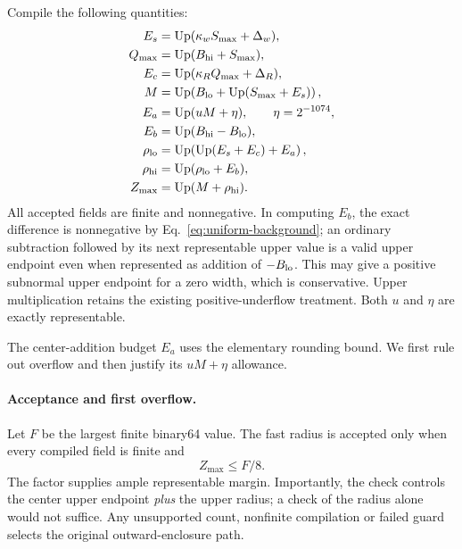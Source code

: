 \documentclass[11pt]{article}
\begin{document}
Compile the following quantities:
\begin{align}
E_s&=\operatorname{Up}(\kappa_wS_{\max}+\Delta_w),\nonumber\\
Q_{\max}&=\operatorname{Up}(B_{\rm hi}+S_{\max}),\nonumber\\
E_c&=\operatorname{Up}(\kappa_RQ_{\max}+\Delta_R),\nonumber\\
M&=\operatorname{Up}\!\left(B_{\rm lo}+\operatorname{Up}(S_{\max}+E_s)\right),\nonumber\\
E_a&=\operatorname{Up}(uM+\eta),\qquad\eta=2^{-1074},\nonumber\\
E_b&=\operatorname{Up}(B_{\rm hi}-B_{\rm lo}),\nonumber\\
\rho_{\rm lo}&=\operatorname{Up}\!\left(\operatorname{Up}(E_s+E_c)+E_a\right),\nonumber\\
\rho_{\rm hi}&=\operatorname{Up}(\rho_{\rm lo}+E_b),\nonumber\\
Z_{\max}&=\operatorname{Up}(M+\rho_{\rm hi}).
\label{eq:uniform-budgets}
\end{align}
All accepted fields are finite and nonnegative. In computing $E_b$, the exact difference is nonnegative by Eq.~\eqref{eq:uniform-background}; an ordinary subtraction followed by its next representable upper value is a valid upper endpoint even when represented as addition of $-B_{\rm lo}$. This may give a positive subnormal upper endpoint for a zero width, which is conservative. Upper multiplication retains the existing positive-underflow treatment. Both $u$ and $\eta$ are exactly representable.

The center-addition budget $E_a$ uses the elementary rounding bound. We first rule out overflow and then justify its $uM+\eta$ allowance.

\paragraph{Acceptance and first overflow.}
Let $F$ be the largest finite binary64 value. The fast radius is accepted only when every compiled field is finite and
\begin{equation}
Z_{\max}\le F/8.
\label{eq:uniform-domain}
\end{equation}
The factor supplies ample representable margin. Importantly, the check controls the center upper endpoint \emph{plus} the upper radius; a check of the radius alone would not suffice. Any unsupported count, nonfinite compilation or failed guard selects the original outward-enclosure path.
\end{document}
